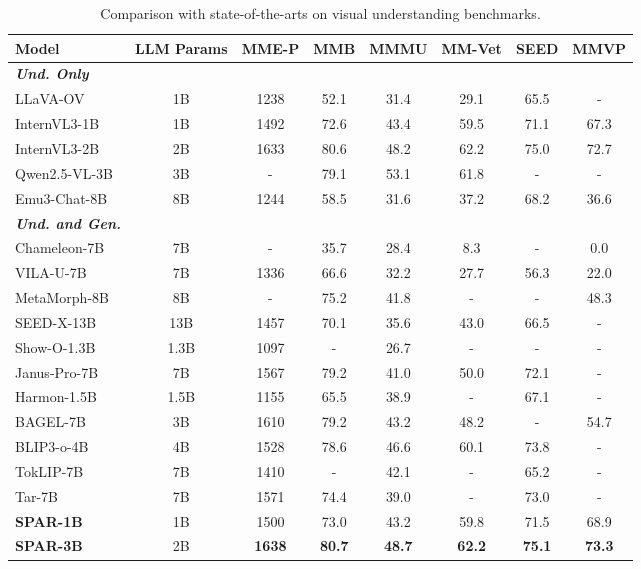 \documentclass[runningheads]{llncs}
\begin{document}
\begin{table}[t]
\centering
\fontsize{8.5pt}{10pt}\selectfont
\caption{Comparison with state-of-the-arts on visual understanding benchmarks.}
\vspace{-10pt}
\begin{tabular}{lccccccc}
\toprule
\textbf{Model} & \textbf{LLM Params} & \textbf{MME-P} & \textbf{MMB} & \textbf{MMMU} & \textbf{MM-Vet} & \textbf{SEED} & \textbf{MMVP} \\ \midrule
\textit{\textbf{Und. Only}} & & & & & & & \\
LLaVA-OV~\cite{li2024llava} & 1B & 1238 & 52.1 & 31.4 & 29.1 & 65.5 & - \\
InternVL3-1B~\cite{zhu2025internvl3} & 1B & 1492 & 72.6 & 43.4 & 59.5 & 71.1 & 67.3 \\
InternVL3-2B~\cite{zhu2025internvl3} & 2B & 1633 & 80.6 & 48.2 & 62.2 & 75.0 & 72.7 \\
Qwen2.5-VL-3B~\cite{Qwen2.5-VL} & 3B & - & 79.1 & 53.1 & 61.8 & - & - \\
Emu3-Chat-8B~\cite{wang2024emu3} & 8B & 1244 & 58.5 & 31.6 & 37.2 & 68.2 & 36.6 \\ \midrule
\textit{\textbf{Und. and Gen.}} & & & & & & & \\
Chameleon-7B~\cite{team2024chameleon} & 7B & - & 35.7 & 28.4 & 8.3 & - & 0.0 \\
VILA-U-7B~\cite{wu2024vila} & 7B & 1336 & 66.6 & 32.2 & 27.7 & 56.3 & 22.0 \\
MetaMorph-8B~\cite{tong2024metamorph} & 8B & - & 75.2 & 41.8 & - & - & 48.3 \\
SEED-X-13B~\cite{ge2024seed} & 13B & 1457 & 70.1 & 35.6 & 43.0 & 66.5 & - \\
Show-O-1.3B~\cite{xie2024showo} & 1.3B & 1097 & - & 26.7 & - & - & - \\
Janus-Pro-7B~\cite{chen2025janus} & 7B & 1567 & 79.2 & 41.0 & 50.0 & 72.1 & - \\
Harmon-1.5B~\cite{wu2025harmon} & 1.5B & 1155 & 65.5 & 38.9 & - & 67.1 & - \\
BAGEL-7B~\cite{deng2025bagel} & 3B & 1610 & 79.2 & 43.2 & 48.2 & - & 54.7 \\
BLIP3-o-4B~\cite{chen2025blip3} & 4B & 1528 & 78.6 & 46.6 & 60.1 & 73.8 & - \\
TokLIP-7B~\cite{lin2025toklip} & 7B & 1410 & - & 42.1 & - & 65.2 & - \\
Tar-7B~\cite{han2025vision} & 7B & 1571 & 74.4 & 39.0 & - & 73.0 & - \\
\rowcolor[HTML]{EFEFEF}
\textbf{SPAR-1B} & 1B & 1500 & 73.0 & 43.2 & 59.8 & 71.5 & 68.9\\
\rowcolor[HTML]{EFEFEF}
\textbf{SPAR-3B} & 2B & \textbf{1638} & \textbf{80.7} & \textbf{48.7} & \textbf{62.2} & \textbf{75.1} & \textbf{73.3}\\
\bottomrule
\end{tabular}
\label{tab:und}
\end{table}
\end{document}

